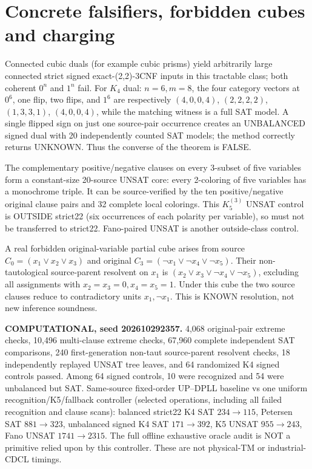 \documentclass[10pt]{article}
\begin{document}
\section{Concrete falsifiers, forbidden cubes and charging}
Connected cubic duals (for example cubic prisms) yield arbitrarily large connected strict signed exact-(2,2)-3CNF inputs in this tractable class; both coherent $0^n$ and $1^n$ fail. For $K_4$ dual: $n=6,m=8$, the four category vectors at $0^6$, one flip, two flips, and $1^6$ are respectively $(4,0,0,4)$, $(2,2,2,2)$, $(1,3,3,1)$, $(4,0,0,4)$, while the matching witness is a full SAT model. A single flipped sign on just one source-pair occurrence creates an UNBALANCED signed dual with 20 independently counted SAT models; the method correctly returns UNKNOWN. Thus the converse of the theorem is FALSE.

The complementary positive/negative clauses on every 3-subset of five variables form a constant-size 20-source UNSAT core: every 2-coloring of five variables has a monochrome triple. It can be source-verified by the ten positive/negative original clause pairs and 32 complete local colorings. This $K_5^{(3)}$ UNSAT control is OUTSIDE strict22 (six occurrences of each polarity per variable), so must not be transferred to strict22. Fano-paired UNSAT is another outside-class control.

A real forbidden original-variable partial cube arises from source $C_0=(x_1\vee x_2\vee x_3)$ and original $C_3=(\neg x_1\vee\neg x_4\vee\neg x_5)$. Their non-tautological source-parent resolvent on $x_1$ is $(x_2\vee x_3\vee\neg x_4\vee\neg x_5)$, excluding all assignments with $x_2=x_3=0,x_4=x_5=1$. Under this cube the two source clauses reduce to contradictory units $x_1,\neg x_1$. This is KNOWN resolution, not new inference soundness.

\noindent\textbf{COMPUTATIONAL, seed 202610292357.} 4,068 original-pair extreme checks, 10,496 multi-clause extreme checks, 67,960 complete independent SAT comparisons, 240 first-generation non-taut source-parent resolvent checks, 18 independently replayed UNSAT tree leaves, and 64 randomized K4 signed controls passed. Among 64 signed controls, 10 were recognized and 54 were unbalanced but SAT. Same-source fixed-order UP--DPLL baseline vs one uniform recognition/K5/fallback controller (selected operations, including all failed recognition and clause scans): balanced strict22 K4 SAT $234\to115$, Petersen SAT $881\to323$, unbalanced signed K4 SAT $171\to392$, K5 UNSAT $955\to243$, Fano UNSAT $1741\to2315$. The full offline exhaustive oracle audit is NOT a primitive relied upon by this controller. These are not physical-TM or industrial-CDCL timings.
\end{document}
